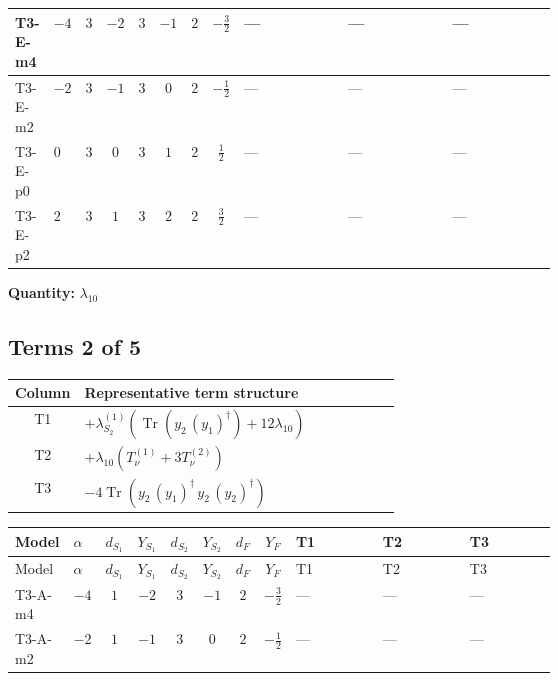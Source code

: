 \documentclass[8pt]{article}
\begin{document}
\begin{landscape}
\begin{longtable}{@{}llcccccc >{\raggedright\arraybackslash}p{0.21\linewidth} >{\raggedright\arraybackslash}p{0.21\linewidth} >{\raggedright\arraybackslash}p{0.21\linewidth}@{}}
\midrule
T3-E-m4 & $-4$ & $3$ & $-2$ & $3$ & $-1$ & $2$ & $-\frac{3}{2}$ & --- & --- & --- \\
\midrule
T3-E-m2 & $-2$ & $3$ & $-1$ & $3$ & $0$ & $2$ & $-\frac{1}{2}$ & --- & --- & --- \\
\midrule
T3-E-p0 & $0$ & $3$ & $0$ & $3$ & $1$ & $2$ & $\frac{1}{2}$ & --- & --- & --- \\
\midrule
T3-E-p2 & $2$ & $3$ & $1$ & $3$ & $2$ & $2$ & $\frac{3}{2}$ & --- & --- & --- \\
\midrule
\bottomrule
\end{longtable}
\clearpage
\noindent\textbf{Quantity: }$\lambda_{10}$\par\smallskip
\subsection*{Terms 2 of 5}
\begin{center}
\begin{tabular}{@{}c >{\raggedright\arraybackslash}p{0.82\linewidth}@{}}
\toprule
Column & Representative term structure \\
\midrule
T1 & \(\displaystyle +{\lambda_{S_2}^{(1)}} (\operatorname{Tr}\!\left({y_2}\,\left({y_1}\right)^{\dagger}\right)+12 {\lambda_{10}})\) \\
\midrule
T2 & \(\displaystyle +{\lambda_{10}} (T_{\nu}^{(1)}+3 T_{\nu}^{(2)})\) \\
\midrule
T3 & \(\displaystyle -4 \operatorname{Tr}\!\left({y_2}\,\left({y_1}\right)^{\dagger}\,{y_2}\,\left({y_2}\right)^{\dagger}\right)\) \\
\midrule
\bottomrule
\end{tabular}
\end{center}
\smallskip
\tiny
\begin{longtable}{@{}llcccccc >{\raggedright\arraybackslash}p{0.21\linewidth} >{\raggedright\arraybackslash}p{0.21\linewidth} >{\raggedright\arraybackslash}p{0.21\linewidth}@{}}
\toprule
Model & $\alpha$ & $d_{S_1}$ & $Y_{S_1}$ & $d_{S_2}$ & $Y_{S_2}$ & $d_F$ & $Y_F$ & T1 & T2 & T3 \\
\midrule
\endfirsthead
\toprule
Model & $\alpha$ & $d_{S_1}$ & $Y_{S_1}$ & $d_{S_2}$ & $Y_{S_2}$ & $d_F$ & $Y_F$ & T1 & T2 & T3 \\
\midrule
\endhead
T3-A-m4 & $-4$ & $1$ & $-2$ & $3$ & $-1$ & $2$ & $-\frac{3}{2}$ & --- & --- & --- \\
\midrule
T3-A-m2 & $-2$ & $1$ & $-1$ & $3$ & $0$ & $2$ & $-\frac{1}{2}$ & --- & --- & --- \\

\end{longtable}
\end{landscape}
\end{document}
